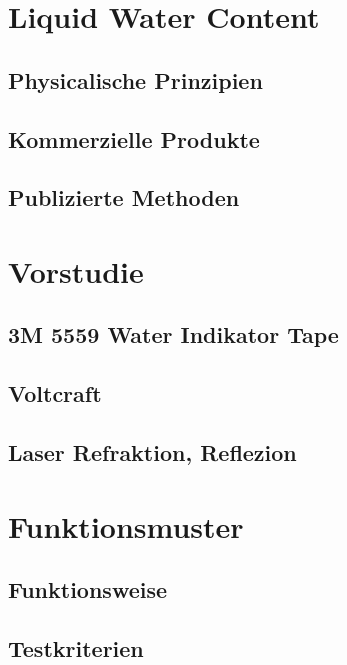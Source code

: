 \documentclass[a4paper,12pt]{article}
\begin{document}
\section{Liquid Water Content}
\subsection{Physicalische Prinzipien}

\subsection{Kommerzielle Produkte}

\subsection{Publizierte Methoden}


\section{Vorstudie}

\subsection{3M 5559 Water Indikator Tape}


\subsection{Voltcraft}


\subsection{Laser Refraktion, Reflezion}


\section{Funktionsmuster}

\subsection{Funktionsweise}

\subsection{Testkriterien}
\end{document}
